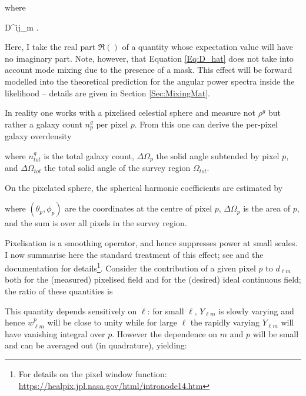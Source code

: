 \noindent where

 {
D^{ij}_{\ell m} \equiv {}.
}

\noindent Here, I take the real part $\Re()$ of a quantity whose expectation value will have no imaginary part. Note, however, that Equation \ref{Eq:D_hat} does not take into account mode mixing due to the presence of a mask. This effect will be forward modelled into the theoretical prediction for the angular power spectra inside the likelihood -- details are given in Section \ref{Sec:MixingMat}.

\qquad In reality one works with a pixelised celestial sphere and measure not $\rho^g$ but rather a galaxy count $n^g_p$ per pixel $p$. From this one can derive the per-pixel galaxy overdensity


\noindent where $n^g_{tot}$ is the total galaxy count, $\Delta \Omega_p$ the solid angle subtended by pixel $p$, and $\Delta \Omega_{tot}$ the total solid angle of the survey region $\Omega_{tot}$.

\qquad On the pixelated sphere, the spherical harmonic coefficients are estimated by


\noindent where $(\theta_p,\phi_p)$ are the coordinates at the centre of pixel $p$, $\Delta\Omega_p$ is the area of $p$, and the sum is over all pixels in the survey region.

\qquad Pixelisation is a smoothing operator, and hence suppresses power at small scales. I now summarise here the standard treatment of this effect; see \cite{Healpix,Boris2013} and the \healpix documentation for details\footnote{For details on the pixel window function: \url{https://healpix.jpl.nasa.gov/html/intronode14.htm}}. Consider the contribution of a given pixel $p$ to $d_{\ell m}$ both for the (measured) pixelised field and for the (desired) ideal continuous field; the ratio of these quantities is 


\noindent This quantity depends sensitively on $\ell$: for small $\ell$, $Y_{\ell m}$ is slowly varying and hence $w_{\ell m}^p$ will be close to unity while for large $\ell$ the rapidly varying $Y_{\ell m}$ will have vanishing integral over $p$. However the dependence on $m$ and $p$ will be small and can be averaged out (in quadrature), yielding:

